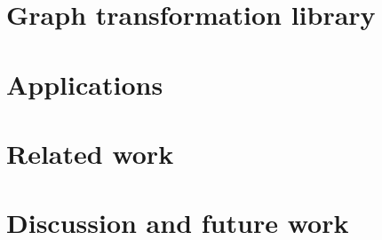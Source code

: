 \documentclass[acmlarge,anonymous]{acmart}\settopmatter{printfolios=true}
\begin{document}
\section{Graph transformation library}\label{sec-transformations}

\section{Applications}\label{sec-applications}

\section{Related work}\label{sec-related}




\section{Discussion and future work}\label{sec-discussion}

\end{document}
